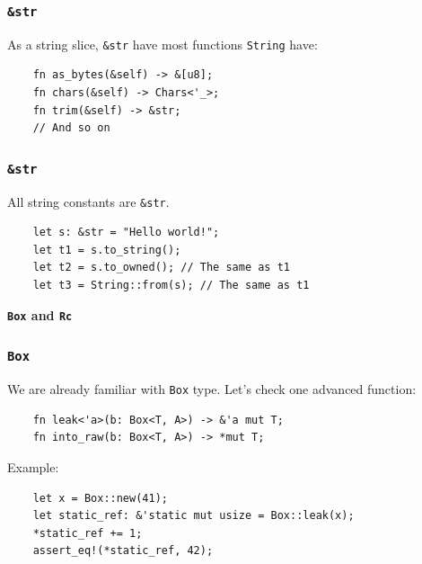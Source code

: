 \documentclass[aspectratio=1610,t]{beamer}
\begin{document}

\begin{frame}[fragile]
\frametitle{\texttt{\&str}}
As a string slice, \texttt{\&str} have most functions \texttt{String} have:

\begin{verbatim}
    fn as_bytes(&self) -> &[u8];
    fn chars(&self) -> Chars<'_>;
    fn trim(&self) -> &str;
    // And so on
\end{verbatim}
\end{frame}


\begin{frame}[fragile]
\frametitle{\texttt{\&str}}
All string constants are \texttt{\&str}.

\begin{verbatim}
    let s: &str = "Hello world!";
    let t1 = s.to_string();
    let t2 = s.to_owned(); // The same as t1
    let t3 = String::from(s); // The same as t1
\end{verbatim}
\end{frame}


\begin{frame}[c]
\centering\Huge\textbf{\texttt{Box} and \texttt{Rc}}
\end{frame}


\begin{frame}[fragile]
\frametitle{\texttt{Box}}
We are already familiar with \texttt{Box} type. Let's check one advanced function:

\begin{verbatim}
    fn leak<'a>(b: Box<T, A>) -> &'a mut T;
    fn into_raw(b: Box<T, A>) -> *mut T;
\end{verbatim}

Example:

\begin{verbatim}
    let x = Box::new(41);
    let static_ref: &'static mut usize = Box::leak(x);
    *static_ref += 1;
    assert_eq!(*static_ref, 42);
\end{verbatim}
\end{frame}

\end{document}
